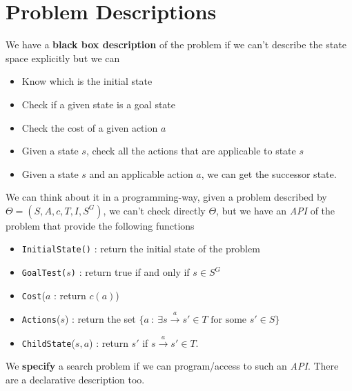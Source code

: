 \documentclass[10pt, letterpaper]{report}
\begin{document}
\section{Problem Descriptions}
\begin{definition}
    We have a \textbf{black box description} of the problem if we can't describe the state space explicitly but we can\begin{itemize}
        \item Know which is the initial state
        \item Check if a given state is a goal state
        \item Check the cost of a given action $a$
        \item Given a state $s$, check all the actions that are applicable to state $s$
        \item Given a state $s$ and an applicable action $a$, we can get the successor state.
    \end{itemize}
\end{definition}
We can think about it in a programming-way, given a problem described by $\Theta=(S,A,c,T,I,S^G)$, we can't check directly $\Theta$, but we have an \textit{API} of the problem that provide the following functions \begin{itemize}
    \item \texttt{InitialState()} : return the initial state of the problem
    \item \texttt{GoalTest($s$)} : return true if and only if $s\in S^G$
    \item \texttt{Cost}($a$ : return $c(a)$)
    \item \texttt{Actions}($s$) : return the set $\{ a \ : \ \exists  s\xrightarrow{a} s'\in T \text{ for some }s'\in S\}$
    \item \texttt{ChildState}($s,a$) : return $s'$ if $s\xrightarrow{a} s'\in T$.
\end{itemize}
We \textbf{specify} a search problem if we can program/access to such an \textit{API}. There are a declarative description too.
\begin{definition}
\end{definition}
\end{document}
